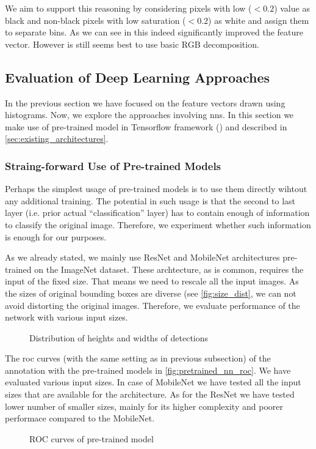 We aim to support this reasoning by considering pixels with low ($< 0.2$)
value as black and non-black pixels with low saturation ($< 0.2$) as white and
assign them to separate bins. As we can see in  this indeed
significantly improved the feature vector. However is still seems best to
use basic RGB decomposition.

\subsection{Evaluation of Deep Learning Approaches}

In the previous section we have focused on the feature vectors drawn using
histograms. Now, we explore the approaches involving \glspl{nn}. In this
section we make use of pre-trained model in Tensorflow framework
(\cite{tensorflow}) and described in \autoref{sec:existing_architectures}.

\subsubsection{Straing-forward Use of Pre-trained Models}

Perhaps the simplest usage of pre-trained models is to use them directly
wihtout any additional training. The potential in such usage is that the
second to last layer (i.e. prior actual ``classification'' layer) has to
contain enough of information to classify the original image. Therefore,
we experiment whether such information is enough for our purposes.

As we already stated, we mainly use ResNet and MobileNet architectures
pre-trained on the ImageNet dataset. These archtecture, as is common,
requires the input of the fixed size. That means we need to rescale all the
input images. As the sizes of original bounding boxes are diverse (see
\autoref{fig:size_dist}, we can not avoid distorting the original images.
Therefore, we evaluate performance of the network with various input sizes.

\begin{figure}
    \centering
    \def\svgwidth{\columnwidth}
    
    \caption{Distribution of heights and widths of detections}
    \label{fig:size_dist}
\end{figure}

The \gls{roc} curves (with the same setting as in previous subsection) of the
annotation with the pre-trained models in \autoref{fig:pretrained_nn_roc}.
We have evaluated various input sizes. In case of MobileNet we have tested
all the input sizes that are available for the architecture. As for the 
ResNet we have tested lower number of smaller sizes, mainly for its higher
complexity and poorer performace compared to the MobileNet.

\begin{figure}
    \centering
    \def\svgwidth{\columnwidth}
    
    \caption{ROC curves of pre-trained model}
    \label{fig:pretrained_nn_roc}
\end{figure}